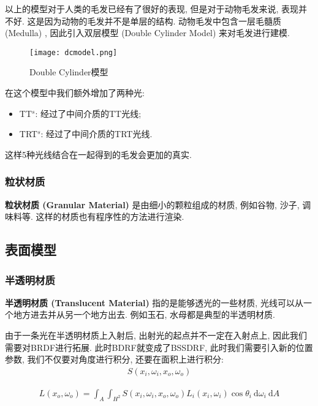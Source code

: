 以上的模型对于人类的毛发已经有了很好的表现, 但是对于动物毛发来说, 表现并不好. 这是因为动物的毛发并不是单层的结构. 动物毛发中包含一层毛髓质 (Medulla) , 因此引入双层模型 (Double Cylinder Model) 来对毛发进行建模. 

\begin{figure}[H]
	\centering
	\texttt{[image: dcmodel.png]}
	\caption{Double Cylinder模型}
	\label{fig:dc}
\end{figure}

在这个模型中我们额外增加了两种光: 
\begin{itemize}
	\item TT$^s$: 经过了中间介质的TT光线; 
	\item TRT$^s$: 经过了中间介质的TRT光线. 
\end{itemize}

这样5种光线结合在一起得到的毛发会更加的真实. 

\subsubsection{粒状材质}

\textbf{粒状材质 (Granular Material) }是由细小的颗粒组成的材质, 例如谷物, 沙子, 调味料等. 这样的材质也有程序性的方法进行渲染. 

\subsection{表面模型}

\subsubsection{半透明材质}

\textbf{半透明材质 (Translucent Material) }指的是能够透光的一些材质, 光线可以从一个地方进去并从另一个地方出去. 例如玉石, 水母都是典型的半透明材质. 

由于一条光在半透明材质上入射后, 出射光的起点并不一定在入射点上, 因此我们需要对BRDF进行拓展. 此时BDRF就变成了BSSDRF, 此时我们需要引入新的位置参数, 我们不仅要对角度进行积分, 还要在面积上进行积分: 
\begin{eqnarray}
	S(x_i,\omega_i,x_o,\omega_o)
\end{eqnarray}

\begin{eqnarray}
	L\left(x_{o}, \omega_{o}\right)=\int_{A} \int_{H^{2}} S\left(x_{i}, \omega_{i}, x_{o}, \omega_{o}\right) L_{i}\left(x_{i}, \omega_{i}\right) \cos \theta_{i} \mathrm{~d} \omega_{i} \mathrm{~d} A
\end{eqnarray}


